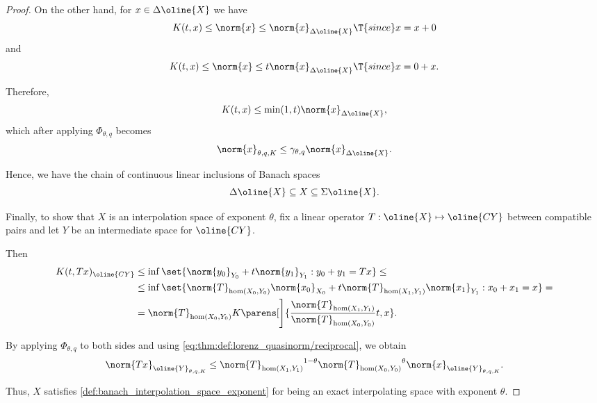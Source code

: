 \begin{proof}
  On the other hand, for \( x \in \Delta \oline{X} \) we have
  \begin{equation*}
    K(t, x) \leq \norm{x} \leq \norm{x}_{\Delta \oline{X}} \T{since} x = x + 0
  \end{equation*}
  and
  \begin{equation*}
    K(t, x) \leq \norm{x} \leq t \norm{x}_{\Delta \oline{X}} \T{since} x = 0 + x.
  \end{equation*}

  Therefore,
  \begin{equation*}
    K(t, x) \leq \min(1, t) \norm{x}_{\Delta \oline{X}},
  \end{equation*}
  which after applying \( \Phi_{\theta,q} \) becomes
  \begin{equation*}
    \norm{x}_{\theta,q,K} \leq \gamma_{\theta,q} \norm{x}_{\Delta \oline{X}}.
  \end{equation*}

  Hence, we have the chain of continuous linear inclusions of Banach spaces
  \begin{equation*}
    \Delta \oline{X} \subseteq X \subseteq \Sigma \oline{X}.
  \end{equation*}

  Finally, to show that \( X \) is an interpolation space of exponent \( \theta \), fix a linear operator \( T: \oline{X} \mapsto \oline{CY} \) between compatible pairs and let \( Y \) be an intermediate space for \( \oline{CY} \).

  Then
  \begin{align*}
    K(t, Tx)_{\oline{CY}}
    &\leq
    \inf \set{ \norm{y_0}_{Y_0} + t \norm{y_1}_{Y_1} : y_0 + y_1 = Tx }
    \leq \\ &\leq
    \inf \set{ \norm{T}_{\hom(X_0, Y_0)} \norm{x_0}_{X_0} + t \norm{T}_{\hom(X_1, Y_1)} \norm{x_1}_{Y_1} : x_0 + x_1 = x }
    = \\ &=
    \norm{T}_{\hom(X_0, Y_0)} K\parens[\Bigg]{\frac {\norm{T}_{\hom(X_1, Y_1)}} {\norm{T}_{\hom(X_0, Y_0)}} t, x}.
  \end{align*}

  By applying \( \Phi_{\theta,q} \) to both sides and using \eqref{eq:thm:def:lorenz_quasinorm/reciprocal}, we obtain
  \begin{equation*}
    \norm{Tx}_{\oline{Y}_{\theta,q,K}}
    \leq
    {\norm{T}_{\hom(X_1, Y_1)}}^{1 - \theta} {\norm{T}_{\hom(X_0, Y_0)}}^{\theta} \norm{x}_{\oline{Y}_{\theta,q,K}}.
  \end{equation*}

  Thus, \( X \) satisfies \cref{def:banach_interpolation_space_exponent} for being an exact interpolating space with exponent \( \theta \).
\end{proof}

